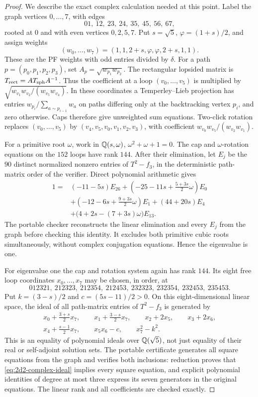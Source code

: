 \begin{proof}
We describe the exact complex calculation needed at this point.
Label the graph vertices $0,\ldots,7$, with edges
\[
01,\ 12,\ 23,\ 24,\ 35,\ 45,\ 56,\ 67,
\]
rooted at $0$ and with even vertices $0,2,5,7$. Put
$s=\sqrt5$, $\varphi=(1+s)/2$, and assign weights
\[
(w_0,\ldots,w_7)=(1,1,2+s,\varphi,\varphi,2+s,1,1).
\]
These are the PF weights with odd entries divided by $\delta$.
For a path $p=(p_0,p_1,p_2,p_3)$, set
$A_p=\sqrt{w_{p_1}w_{p_2}}$. The rectangular lopsided matrix is
$T_{\rm rect}=A T_{\rm sph}A^{-1}$. Thus the coefficient at a
loop $(v_0,\ldots,v_5)$ is multiplied by
$\sqrt{w_{v_1}w_{v_2}/(w_{v_5}w_{v_4})}$.
In these coordinates a Temperley--Lieb projection has entries
$w_{p_i}/\sum_{a\sim p_{i-1}}w_a$ on paths differing only
at the backtracking vertex $p_i$, and zero otherwise. Caps
therefore give unweighted sum equations. Two-click rotation
replaces $(v_0,\ldots,v_5)$ by $(v_4,v_5,v_0,v_1,v_2,v_3)$,
with coefficient $w_{v_0}w_{v_5}/(w_{v_2}w_{v_1})$.

For a primitive root $\omega$, work in
$\mathbb Q(s,\omega)$, $\omega^2+\omega+1=0$. The cap and
$\omega$-rotation equations on the $152$ loops have rank
$144$. After their elimination, let $E_j$ be the $90$
distinct normalized nonzero entries of $T^2-f_3$, in the
deterministic path-matrix order of the verifier. Direct
polynomial arithmetic gives
\[
\begin{split}
1={}&(-11-5s)E_{26}
 +\left(-25-11s+\frac{5+3s}{2}\omega\right)E_0\\
 &+\left(-12-6s+\frac{9+3s}{2}\omega\right)E_1
 +(44+20s)E_4\\
 &+\bigl(4+2s-(7+3s)\omega\bigr)E_{13}.
\end{split}
\]
The portable checker reconstructs the linear elimination and
every $E_j$ from the graph before checking this identity. It
excludes both primitive cubic roots simultaneously, without
complex conjugation equations. Hence the eigenvalue is one.

For eigenvalue one the cap and rotation system again has rank
$144$. Its eight free loop
coordinates $x_0,\ldots,x_7$ may be chosen, in order, at
\[
012321,\ 212323,\ 212354,\ 212453,\
232323,\ 232354,\ 232453,\ 235453.
\]
Put $k=(3-s)/2$ and $c=(5s-11)/2>0$.
On this eight-dimensional linear space, the ideal of all
path-matrix entries of $T^2-f_3$ is generated by
\begin{equation}\label{eq:2d2-complex-ideal}
\begin{gathered}
x_0+\frac{3+s}{2}x_7,\qquad
x_1+\frac{3-s}{2}x_7,\qquad
x_2+2x_5,\qquad x_3+2x_6,\\
x_4+\frac{s-1}{2}x_7,\qquad
x_5x_6-c,\qquad x_7^2-k^2.
\end{gathered}
\end{equation}
This is an equality of polynomial ideals over $\mathbb Q(\sqrt5)$,
not just equality of their real or self-adjoint solution sets.
The portable certificate generates all square equations from
the graph and verifies both inclusions: reduction proves that
\eqref{eq:2d2-complex-ideal} implies every square equation, and
explicit polynomial identities of degree at most three express
its seven generators in the original equations. The linear rank
and all coefficients are checked exactly.


\end{proof}
